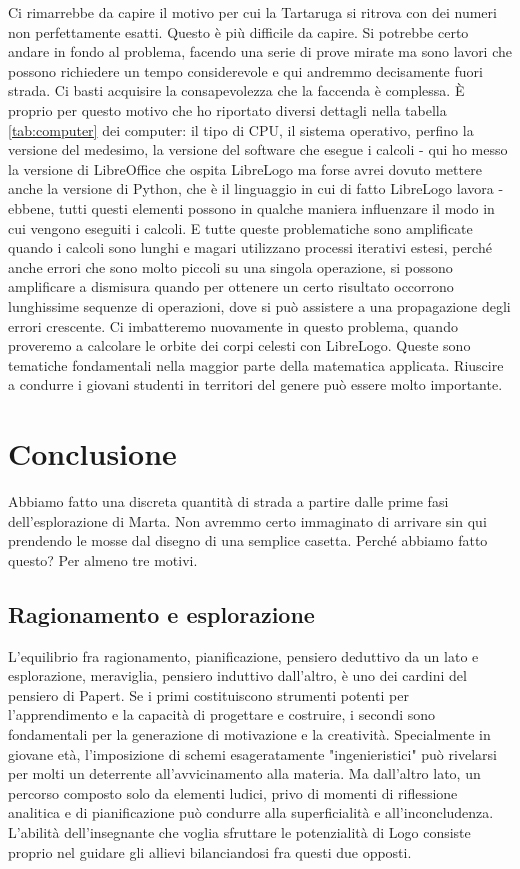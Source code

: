 Ci rimarrebbe da capire il motivo per cui la Tartaruga si ritrova con dei
numeri non perfettamente esatti. Questo è più difficile da capire. Si potrebbe
certo andare in fondo al problema, facendo una serie di prove mirate ma sono
lavori che possono richiedere un tempo considerevole e qui andremmo decisamente
fuori strada. Ci basti acquisire la consapevolezza che la faccenda è complessa. È proprio per questo
motivo che ho riportato diversi dettagli nella tabella \ref{tab:computer} dei
computer: il tipo di CPU, il sistema operativo, perfino la versione del
medesimo, la versione del software che esegue i calcoli - qui ho messo la
versione di LibreOffice che ospita LibreLogo ma forse avrei dovuto mettere
anche la versione di Python, che è il linguaggio in cui di fatto LibreLogo lavora
- ebbene, tutti questi elementi possono in qualche maniera influenzare il modo
in cui vengono eseguiti i calcoli. E tutte queste problematiche sono
amplificate quando i calcoli sono lunghi e magari utilizzano processi iterativi
estesi, perché anche errori che sono molto piccoli su una singola operazione,
si possono amplificare a dismisura quando per ottenere un certo risultato
occorrono lunghissime sequenze di operazioni, dove si può assistere a una
propagazione degli errori crescente. Ci imbatteremo nuovamente in questo
problema, quando proveremo a calcolare le orbite dei corpi celesti con
LibreLogo. Queste sono tematiche fondamentali nella maggior parte della
matematica applicata. Riuscire a condurre i giovani studenti in territori del
genere può essere molto importante.


\section{Conclusione}

Abbiamo fatto una discreta quantità di strada a partire dalle prime fasi
dell'esplorazione di Marta. Non avremmo certo immaginato di arrivare sin qui
prendendo le mosse dal disegno di una semplice casetta. Perché abbiamo fatto
questo? Per almeno tre motivi.


\subsection{Ragionamento e esplorazione}

L'equilibrio fra ragionamento, pianificazione, pensiero deduttivo da un lato e
esplorazione, meraviglia, pensiero induttivo dall'altro, è uno dei cardini del
pensiero di Papert. Se i primi costituiscono strumenti potenti per
l'apprendimento e la capacità di progettare e costruire, i secondi sono
fondamentali per la generazione di motivazione e la creatività. Specialmente in
giovane età, l'imposizione di schemi esageratamente "ingenieristici" può
rivelarsi per molti un deterrente all'avvicinamento alla materia. Ma dall'altro
lato, un percorso composto solo da elementi ludici, privo di momenti di
riflessione analitica e di pianificazione può condurre alla superficialità e
all'inconcludenza. L'abilità dell'insegnante che voglia sfruttare le
potenzialità di Logo consiste proprio nel guidare gli allievi bilanciandosi fra
questi due opposti. 

